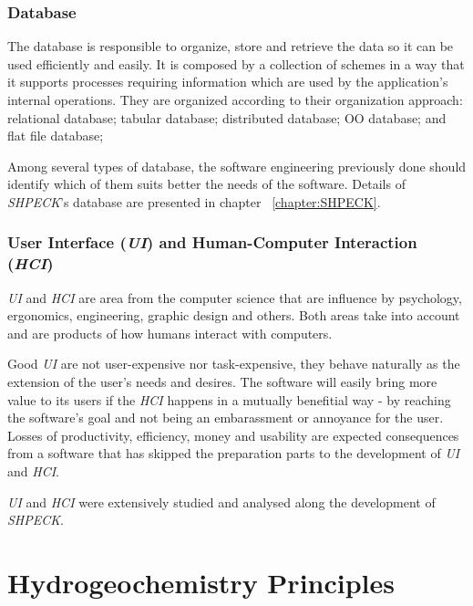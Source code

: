 \documentclass[ppgc,mestrado,english]{iiufrgs}
\begin{document}
\subsubsection{Database}
The database is responsible to organize, store and retrieve the data so it can be used efficiently and easily. It is composed by a collection of schemes in a way that it supports processes requiring information which are used by the application's internal operations. They are organized according to their organization approach: relational database; tabular database; distributed database; OO database; and flat file database; 

Among several types of database, the software engineering previously done should identify which of them suits better the needs of the software. Details of \emph{SHPECK}'s database are presented in chapter ~\ref{chapter:SHPECK}.

\subsubsection{User Interface (\emph{UI}) and Human-Computer Interaction (\emph{HCI})}
\emph{UI} and \emph{HCI} are area from the computer science that are influence by psychology, ergonomics, engineering, graphic design and others. Both areas take into account and are products of how humans interact with computers. 

Good \emph{UI} are not user-expensive nor task-expensive, they behave naturally as the extension of the user's needs and desires. The software will easily bring more value to its users if the \emph{HCI} happens in a mutually benefitial way - by reaching the software's goal and not being an embarassment or annoyance for the user. Losses of productivity, efficiency, money and usability are expected consequences from a software that has skipped the preparation parts to the development of \emph{UI} and \emph{HCI}.

\emph{UI} and \emph{HCI} were extensively studied and analysed along the development of \emph{SHPECK}. 

\section{Hydrogeochemistry Principles}
\end{document}
